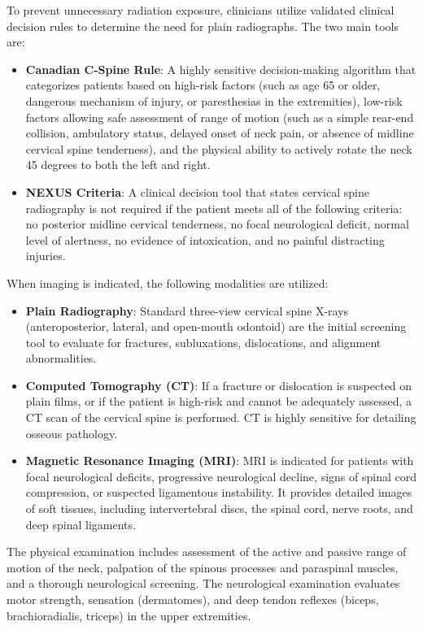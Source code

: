 To prevent unnecessary radiation exposure, clinicians utilize validated clinical decision rules to determine the need for plain radiographs. The two main tools are:
\begin{itemize}
    \item \textbf{Canadian C-Spine Rule}: A highly sensitive decision-making algorithm that categorizes patients based on high-risk factors (such as age 65 or older, dangerous mechanism of injury, or paresthesias in the extremities), low-risk factors allowing safe assessment of range of motion (such as a simple rear-end collision, ambulatory status, delayed onset of neck pain, or absence of midline cervical spine tenderness), and the physical ability to actively rotate the neck 45 degrees to both the left and right.
    \item \textbf{NEXUS Criteria}: A clinical decision tool that states cervical spine radiography is not required if the patient meets all of the following criteria: no posterior midline cervical tenderness, no focal neurological deficit, normal level of alertness, no evidence of intoxication, and no painful distracting injuries.
\end{itemize}

When imaging is indicated, the following modalities are utilized:
\begin{itemize}
    \item \textbf{Plain Radiography}: Standard three-view cervical spine X-rays (anteroposterior, lateral, and open-mouth odontoid) are the initial screening tool to evaluate for fractures, subluxations, dislocations, and alignment abnormalities.
    \item \textbf{Computed Tomography (CT)}: If a fracture or dislocation is suspected on plain films, or if the patient is high-risk and cannot be adequately assessed, a CT scan of the cervical spine is performed. CT is highly sensitive for detailing osseous pathology.
    \item \textbf{Magnetic Resonance Imaging (MRI)}: MRI is indicated for patients with focal neurological deficits, progressive neurological decline, signs of spinal cord compression, or suspected ligamentous instability. It provides detailed images of soft tissues, including intervertebral discs, the spinal cord, nerve roots, and deep spinal ligaments.
\end{itemize}

The physical examination includes assessment of the active and passive range of motion of the neck, palpation of the spinous processes and paraspinal muscles, and a thorough neurological screening. The neurological examination evaluates motor strength, sensation (dermatomes), and deep tendon reflexes (biceps, brachioradialis, triceps) in the upper extremities.

